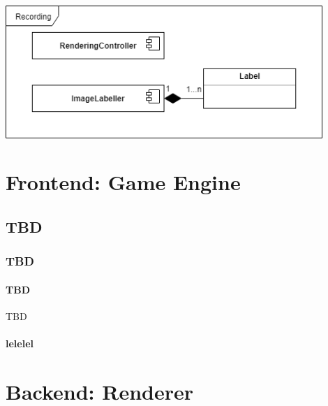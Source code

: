\begin{center}
\noindent\includegraphics[width=12cm]{tex/img/ch04/Component_Diagram_Recording03.png}
\label{fig:component-diagram}
\end{center}



\section{Frontend: Game Engine}

\subsection{TBD}

\subsubsection{TBD}
 
\paragraph{TBD} TBD
\paragraph{lelelel}

\section{Backend: Renderer}